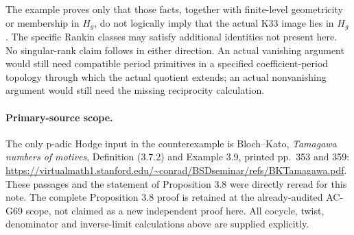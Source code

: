 The example proves only that those facts, together with finite-level
geometricity or membership in \(H_g\), do not logically imply that
the actual K33 image lies in \(H_g\).  The specific Rankin classes may
satisfy additional identities not present here.  No singular-rank
claim follows in either direction.  An actual vanishing argument
would still need compatible period primitives in a specified
coefficient-period topology through which the actual quotient
extends; an actual nonvanishing argument would still need the
missing reciprocity calculation.

\paragraph{Primary-source scope.}
The only p-adic Hodge input in the counterexample is
Bloch--Kato, \emph{Tamagawa numbers of motives}, Definition (3.7.2)
and Example 3.9, printed pp.~353 and 359:
\url{https://virtualmath1.stanford.edu/~conrad/BSDseminar/refs/BKTamagawa.pdf}.
These passages and the statement of Proposition 3.8 were directly
reread for this note.  The complete Proposition 3.8 proof is retained
at the already-audited AC-G69 scope, not claimed as a new independent
proof here.  All cocycle, twist, denominator and inverse-limit
calculations above are supplied explicitly.

